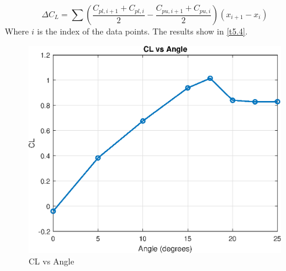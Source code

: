 $$
\Delta C_{L}=\sum\left(\frac{C_{pl,i+1}+C_{pl,i}}{2}-\frac{C_{p u ,i+1}+C_{p u ,i}}{2}\right)\left(x_{i+1}-x_{i}\right)
$$
Where $i$ is the index of the data points. The results show in \autoref{t5.4}.
\begin{table}[]
    \caption{Lift coefficient in different angle} 
	\label{t5.4}
    \centering
    \end{table}

\begin{figure}[htb] %
        \centering
        \includegraphics[scale=0.6]{CL.eps}
        \caption{CL vs Angle}
        \label{tcl}
\end{figure}
